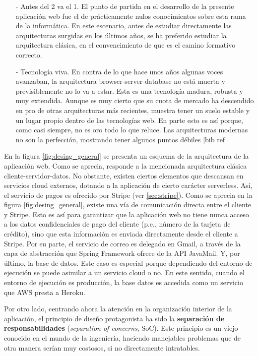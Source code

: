 \documentclass[a4paper]{article}
\begin{document}
    \begin{itemize}
    	\item[-] Antes del 2 va el 1. El punto de partida en el desarrollo de la presente aplicación web fue el de prácticamente nulos conocimientos sobre esta rama de la informática. En este escenario, antes de estudiar directamente las arquitecturas surgidas en los últimos años, se ha preferido estudiar la arquitectura clásica, en el convencimiento de que es el camino formativo correcto.
    	\item[-] Tecnología viva. En contra de lo que hace unos años algunas voces avanzaban, la arquitectura browser-server-database no está muerta y previsiblemente no lo va a estar. Esta es una tecnología madura, robusta y muy extendida. Aunque es muy cierto que su cuota de mercado ha descendido en pro de otras arquitecturas más recientes, muestra tener un suelo estable y un lugar propio dentro de las tecnologías web. En parte esto es así porque, como casi siempre, no es oro todo lo que reluce. Las arquitecturas modernas no son la perfección, mostrando tener algunos puntos débiles [bib ref].
    \end{itemize}
    
    En la figura \ref{fig:desing_general} se presenta un esquema de la arquitectura de la aplicación web. Como se aprecia, responde a la mencionada arquitectura clásica cliente-servidor-datos. No obstante, existen ciertos elementos que descansan en servicios cloud externos, dotando a la aplicación de cierto carácter serverless. Así, el servicio de pagos es ofrecido por Stripe (ver \ref{sec:stripe}). Como se aprecia en la figura \ref{fig:desing_general}, existe una vía de comunicación directa entre el cliente y Stripe. Esto es así para garantizar que la aplicación web no tiene nunca acceso a los datos confidenciales de pago del cliente (p.e., número de la tarjeta de crédito), sino que esta información es enviada directamente desde el cliente a Stripe. Por su parte, el servicio de correo es delegado en Gmail, a través de la capa de abstracción que Spring Framework ofrece de la API JavaMail. Y, por último, la base de datos. Este caso es especial porque dependiendo del entorno de ejecución se puede asimilar a un servicio cloud o no. En este sentido, cuando el entorno de ejecución es producción, la base datos es accedida como un servicio que AWS presta a Heroku.
        
    Por otro lado, centrando ahora la atención en la organización interior de la aplicación, el principio de diseño protagonista ha sido la \textbf{separación de responsabilidades} (\emph{separation of concerns}, SoC). Este principio es un viejo conocido en el mundo de la ingeniería, haciendo manejables problemas que de otra manera serían muy costosos, si no directamente intratables.
    
\end{document}
